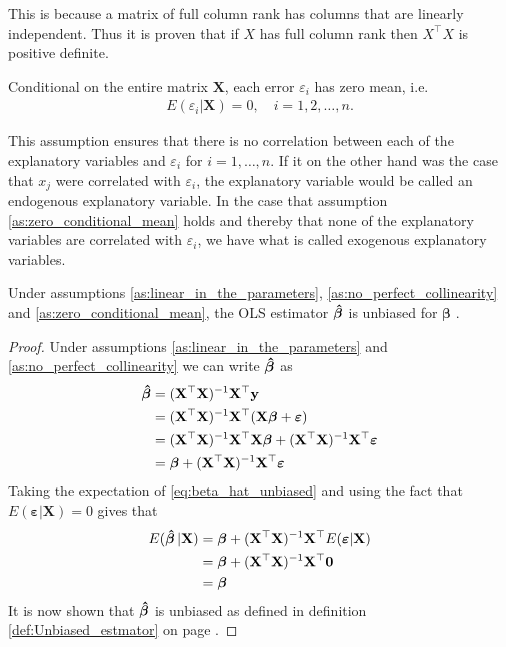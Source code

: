 This is because a matrix of full column rank has columns that are linearly independent.
Thus it is proven that if $X$ has full column rank then $X^\top X$ is positive definite.
\begin{assumption}\label{as:zero_conditional_mean}
    Conditional on the entire matrix $\mathbf{X}$, each error $\varepsilon_i$ has zero mean, i.e. \cite[p. 810]{Wooldridge2012}
    \begin{align*}
        E(\varepsilon_i | \mathbf{X}) = 0, \quad i = 1, 2, \ldots, n.
    \end{align*}
\end{assumption}
This assumption ensures that there is no correlation between each of the explanatory variables and $\varepsilon_i$ for $i = 1, \ldots, n$.
If it on the other hand was the case that $x_j$ were correlated with $\varepsilon_i$, the explanatory variable would be called an endogenous explanatory variable.
In the case that assumption \ref{as:zero_conditional_mean} holds and thereby that none of the explanatory variables are correlated with $\varepsilon_i$, we have what is called exogenous explanatory variables.
\begin{theorem}
    Under assumptions \ref{as:linear_in_the_parameters}, \ref{as:no_perfect_collinearity} and \ref{as:zero_conditional_mean}, the OLS estimator $\operatorname{\boldsymbol{\hat{\beta}}}$ is unbiased for $\boldsymbol{\beta}$ \cite[p. 810]{Wooldridge2012}.
\end{theorem}\label{th:unbiasedness_of_ols}
\begin{proof}
    Under assumptions \ref{as:linear_in_the_parameters} and \ref{as:no_perfect_collinearity} we can write $\operatorname{\boldsymbol{\hat{\beta}}}$ as
    \begin{align}
        \operatorname{\boldsymbol{\hat{\beta}}} &= (\mathbf{X}^\top\mathbf{X})^{-1}\mathbf{X}^\top\mathbf{y} \nonumber\\
        &= (\mathbf{X}^\top\mathbf{X})^{-1}\mathbf{X}^\top(\mathbf{X}\boldsymbol{\beta} + \boldsymbol{\varepsilon}) \nonumber\\
        &=(\mathbf{X}^\top\mathbf{X})^{-1}\mathbf{X}^\top\mathbf{X}\boldsymbol{\beta} + (\mathbf{X}^\top\mathbf{X})^{-1}\mathbf{X}^\top\boldsymbol{\varepsilon} \nonumber\\
        &= \boldsymbol{\beta} + (\mathbf{X}^\top\mathbf{X})^{-1}\mathbf{X}^\top\boldsymbol{\varepsilon} \label{eq:beta_hat_unbiased}
    \end{align}
    Taking the expectation of \eqref{eq:beta_hat_unbiased} and using the fact that $E(\boldsymbol{\varepsilon} | \mathbf{X}) = 0$ gives that
    \begin{align*}
        E(\operatorname{\boldsymbol{\hat{\beta}}} | \mathbf{X}) &= \boldsymbol{\beta} + (\mathbf{X}^\top\mathbf{X})^{-1}\mathbf{X}^\top E(\boldsymbol{\varepsilon} | \mathbf{X}) \\
        &= \boldsymbol{\beta} + (\mathbf{X}^\top\mathbf{X})^{-1}\mathbf{X}^\top \mathbf{0} \\
        &= \boldsymbol{\beta}
    \end{align*}
    It is now shown that $\operatorname{\boldsymbol{\hat{\beta}}}$ is unbiased as defined in definition \ref{def:Unbiased_estmator} on page \pageref{def:Unbiased_estmator}.
\end{proof}
